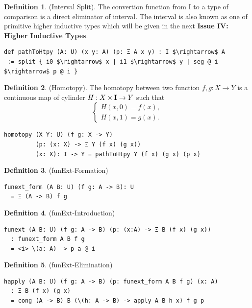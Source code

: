 \documentclass{article}
\theoremstyle{definition}
\newtheorem{definition}{Definition}
\begin{document}
\begin{definition} (Interval Split).
The convertion function from $\mathrm{I}$ to a type of comparison
is a direct eliminator of interval. The interval is also known as one of
primitive higher inductive types which will be given in the next
{\bf Issue IV: Higher Inductive Types}.
\begin{lstlisting}[mathescape=true]
def pathToHtpy (A: U) (x y: A) (p: Ξ A x y) : I $\rightarrow$ A
 := split { i0 $\rightarrow$ x | i1 $\rightarrow$ y | seg @ i $\rightarrow$ p @ i }
\end{lstlisting}
\end{definition}

\begin{definition} (Homotopy). The homotopy between two function $f,g: X \rightarrow Y$
is a continuous map of cylinder $H : X \times {\bf I} \rightarrow Y$ such that
$$
\begin{cases}
H(x,0)=f(x), \\
H(x,1)=g(x).
\end{cases}
$$
\begin{lstlisting}
homotopy (X Y: U) (f g: X -> Y)
         (p: (x: X) -> Ξ Y (f x) (g x))
         (x: X): I -> Y = pathToHtpy Y (f x) (g x) (p x)
\end{lstlisting}
\end{definition}

\newpage
\begin{definition} (funExt-Formation)
\begin{lstlisting}
funext_form (A B: U) (f g: A -> B): U
  = Ξ (A -> B) f g
\end{lstlisting}
\end{definition}

\begin{definition} (funExt-Introduction)
\begin{lstlisting}
funext (A B: U) (f g: A -> B) (p: (x:A) -> Ξ B (f x) (g x))
  : funext_form A B f g
  = <i> \(a: A) -> p a @ i
\end{lstlisting}
\end{definition}

\begin{definition} (funExt-Elimination)
\begin{lstlisting}
happly (A B: U) (f g: A -> B) (p: funext_form A B f g) (x: A)
  : Ξ B (f x) (g x)
  = cong (A -> B) B (\(h: A -> B) -> apply A B h x) f g p
\end{lstlisting}
\end{definition}
\end{document}
